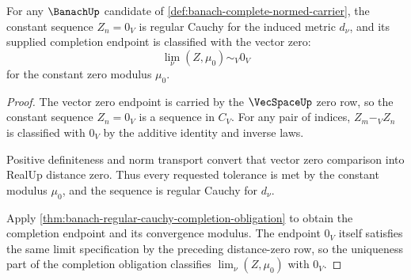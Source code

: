 \begin{theorem}
\label{thm:banach-zero-sequence-limit-obligation}
For any $\BanachUp$ candidate of
\autoref{def:banach-complete-normed-carrier}, the constant sequence
$Z_n=0_V$ is regular Cauchy for the induced metric $d_\nu$, and its supplied
completion endpoint is classified with the vector zero:
$$
\lim_\nu(Z,\mu_0)\sim_V 0_V
$$
for the constant zero modulus $\mu_0$.
\end{theorem}
\begin{proof}
The vector zero endpoint is carried by the $\VecSpaceUp$ zero row, so the
constant sequence $Z_n=0_V$ is a sequence in $C_V$. For any pair of indices,
$Z_m-_V Z_n$ is classified with $0_V$ by the additive identity and inverse
laws.

Positive definiteness and norm transport convert that vector zero comparison
into RealUp distance zero. Thus every requested tolerance is met by the
constant modulus $\mu_0$, and the sequence is regular Cauchy for $d_\nu$.

Apply
\autoref{thm:banach-regular-cauchy-completion-obligation} to obtain the
completion endpoint and its convergence modulus. The endpoint $0_V$ itself
satisfies the same limit specification by the preceding distance-zero row, so
the uniqueness part of the completion obligation classifies
$\lim_\nu(Z,\mu_0)$ with $0_V$.
\end{proof}

